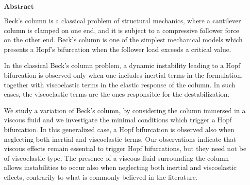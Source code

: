 \documentclass[12pt]{article}
\begin{document}
\begin{center}
$\mathbf{Abstract}$
\end{center}
Beck's column is a classical problem of structural mechanics, where a cantilever column is clamped on one end, and it is subject to a compressive follower force on the other end. Beck's column is one of the simplest mechanical models which presents a Hopf's bifurcation when the follower load exceeds a critical value. 

In the classical Beck's column problem, a dynamic instability leading to a Hopf bifurcation is observed only when one includes inertial terms in the formulation, together with viscoelastic terms in the elastic response of the column. In such cases, the viscoelastic terms are the ones responsible for the destabilization.  

We study a variation of Beck's column, by considering the column immersed in a viscous fluid and we investigate the minimal conditions which trigger a Hopf bifurcation. In this generalized case, a Hopf bifurcation is observed also when neglecting both inertial and viscoelastic terms. Our observations indicate that viscous effects remain essential to trigger Hopf bifurcations, but they need not be of viscoelastic type. The presence of a viscous fluid surrounding the column allows instabilities to occur also when neglecting both inertial and viscoelastic effects, contrarily to what is commonly believed in the literature.
\end{document}
